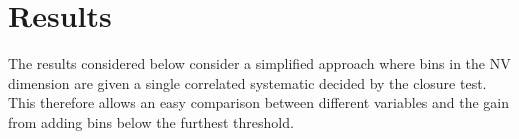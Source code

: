 \section{Results}

The results considered below consider a simplified approach where bins in the NV dimension are given a single correlated systematic decided by the closure test. This therefore allows an easy comparison between different variables and the gain from adding bins below the furthest threshold.








